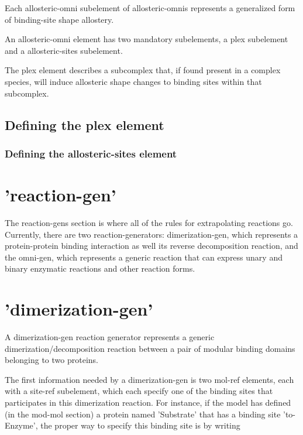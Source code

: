 Each allosteric-omni subelement of allosteric-omnis represents a
generalized form of binding-site shape allostery.  

An allosteric-omni element has two mandatory subelements, a plex
subelement and a allosteric-sites subelement.

The plex element describes a subcomplex that, if found present in a
complex species, will induce allosteric shape changes to binding sites
within that subcomplex.  

\subsection{Defining the plex element}

\subsubsection{Defining the allosteric-sites element}



\section{'reaction-gen'}

The reaction-gens section is where all of the rules for extrapolating
reactions go.  Currently, there are two
reaction-generators: dimerization-gen, which represents a
protein-protein binding interaction as well its reverse decomposition
reaction, and the omni-gen, which represents a generic reaction that
can express unary and binary enzymatic reactions and other reaction
forms.  

\section{'dimerization-gen'}
A dimerization-gen reaction generator represents a generic
dimerization/decomposition reaction between a pair of modular binding
domains belonging to two proteins.  

The first information needed by a dimerization-gen is two mol-ref
elements, each with a site-ref subelement, which each specify one of
the binding sites that participates in this dimerization reaction.
For instance, if the model has defined (in the mod-mol section) a
protein named 'Substrate' that has a binding site 'to-Enzyme', the
proper way to specify this binding site is by writing 

